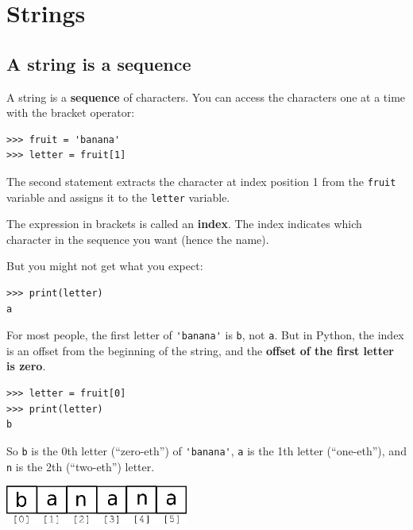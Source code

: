 
\chapter{Strings}
\label{strings}


\section{A string is a sequence}

A string is a {\bf sequence} of characters.  
You can access the characters one at a time with the
bracket operator:

\beforeverb
\begin{verbatim}
>>> fruit = 'banana'
>>> letter = fruit[1]
\end{verbatim}
\afterverb
%
The second statement extracts the character at index position 1 from the 
{\tt fruit} variable and assigns it to the {\tt letter} variable.  

The expression in brackets is called an {\bf index}.  
The index indicates which character in the sequence you
want (hence the name).

But you might not get what you expect:

\beforeverb
\begin{verbatim}
>>> print(letter)
a
\end{verbatim}
\afterverb
%
For most people, the first letter of \verb"'banana'" is {\tt b}, not
{\tt a}.  But in Python, the index is an offset from the
beginning of the string, and the {\bf offset of the first letter is zero}.

\beforeverb
\begin{verbatim}
>>> letter = fruit[0]
>>> print(letter)
b
\end{verbatim}
\afterverb
%
So {\tt b} is the 0th letter (``zero-eth'') of \verb"'banana'", {\tt a}
is the 1th letter (``one-eth''), and {\tt n} is the 2th (``two-eth'')
letter.

\beforefig
\centerline{\includegraphics[height=0.50in]{figs2/string.eps}}
\afterfig

